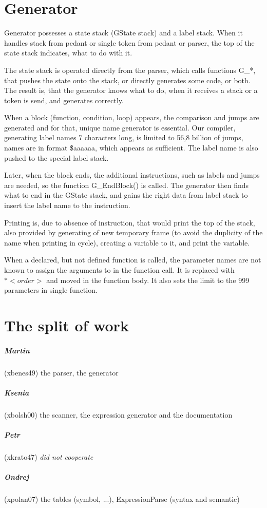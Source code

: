 \documentclass[10pt,a4paper,titlepage]{article}
\begin{document}
\section{Generator}
\begin{justify}
Generator possesses a state stack (GState stack) and a label stack.
When it handles stack from pedant or single token from pedant or parser,
the top of the state stack indicates, what to do with it.

The state stack is operated directly from the parser, which calls functions
G\_*, that pushes the state onto the stack, or directly generates some code,
or both. The result is, that the generator knows what to do, when it receives
a stack or a token is send, and generates correctly.

When a block (function, condition, loop) appears, the comparison and jumps
are generated and for that, unique name generator is essential. Our compiler,
generating label names 7 characters long, is limited to 56,8 billion of jumps,
names are in format \$aaaaaa, which appears as sufficient. The label name
is also pushed to the special label stack.

Later, when the block ends, the additional instructions, such as labels
and jumps are needed, so the function G\_EndBlock() is called. The generator
then finds what to end in the GState stack, and gains the right data from
label stack to insert the label name to the instruction.

Printing is, due to absence of instruction, that would print the top of the
stack, also provided by generating of new temporary frame (to avoid the
duplicity of the name when printing in cycle), creating a variable to it,
and print the variable.

When a declared, but not defined function is called, the parameter names
are not known to assign the arguments to in the function call. It is
replaced with $*<order>$ and moved in the function body. It also sets the
limit to the 999 parameters in single function.
\end{justify}
\newpage

\section{The split of work}
\subparagraph{Martin} (xbenes49) the parser, the generator
\subparagraph{Ksenia} (xbolsh00) the scanner, the expression generator and the documentation
\subparagraph{Petr} (xkrato47) {\it did not cooperate}
\subparagraph{Ondrej} (xpolan07) the tables (symbol, ...), ExpressionParse (syntax and semantic)
\end{document}
